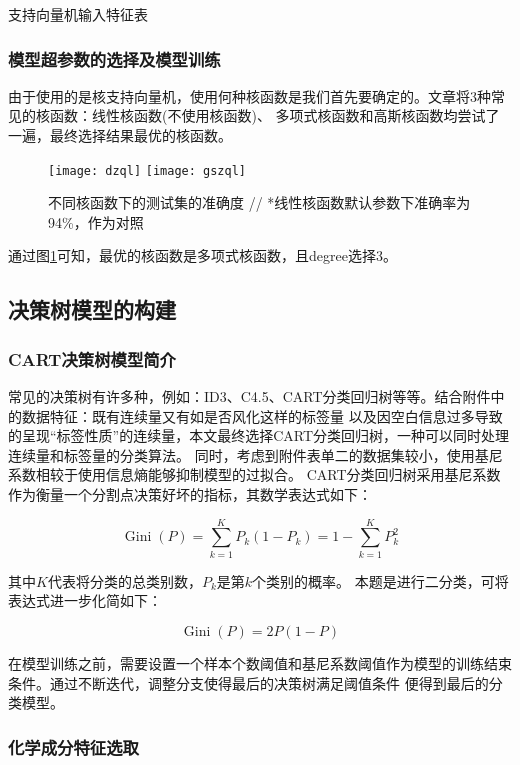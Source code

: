 \documentclass[withoutpreface,bwprint]{cumcmthesis} %
\begin{document}
\begin{table}[!h]
	\centering
	\caption{支持向量机输入特征表}
	\label{6-1}
\end{table}

\subsubsection{模型超参数的选择及模型训练}

由于使用的是核支持向量机，使用何种核函数是我们首先要确定的。文章将3种常见的核函数：线性核函数(不使用核函数)、 多项式核函数和高斯核函数均尝试了一遍，最终选择结果最优的核函数。

\begin{figure}[!h]
	\centering
	\texttt{[image: dzql]}
	\texttt{[image: gszql]}
	\caption{不同核函数下的测试集的准确度 // *线性核函数默认参数下准确率为94\%，作为对照}
	\label{zqd}
\end{figure}

通过图\ref{zqd}可知，最优的核函数是多项式核函数，且degree选择3。


\subsection{决策树模型的构建}

\subsubsection{CART决策树模型简介}

常见的决策树有许多种，例如：ID3、C4.5、CART分类回归树等等。结合附件中的数据特征：既有连续量又有如是否风化这样的标签量 以及因空白信息过多导致的呈现“标签性质”的连续量，本文最终选择CART分类回归树，一种可以同时处理连续量和标签量的分类算法。 同时，考虑到附件表单二的数据集较小，使用基尼系数相较于使用信息熵能够抑制模型的过拟合。 CART分类回归树采用基尼系数作为衡量一个分割点决策好坏的指标，其数学表达式如下：

 $$\operatorname{Gini}(P)=\sum_{k=1}^{K} P_{k}\left(1-P_{k}\right)=1-\sum_{k=1}^{K} P_{k}^{2}$$
 
其中$K$代表将分类的总类别数，$P_k$是第$k$个类别的概率。 本题是进行二分类，可将表达式进一步化简如下：

 $$\operatorname{Gini}(P)=2 P(1-P)$$
 
在模型训练之前，需要设置一个样本个数阈值和基尼系数阈值作为模型的训练结束条件。通过不断迭代，调整分支使得最后的决策树满足阈值条件 便得到最后的分类模型。

\subsubsection{化学成分特征选取}
\end{document}
